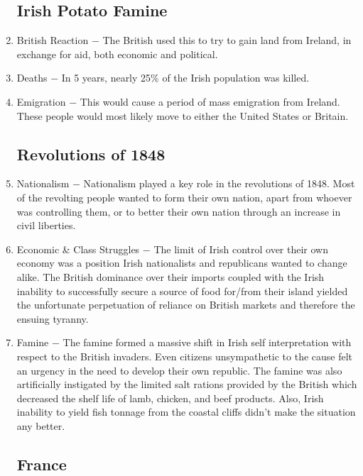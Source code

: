 \documentclass[12pt]{article}
\begin{document}
\begin{enumerate}
\subsection{Irish Potato Famine}

\item British Reaction $-$ The British used this to try to gain land from Ireland, in exchange for aid, both economic and political. 

\item Deaths $-$ In 5 years, nearly 25\% of the Irish population was killed.

\item Emigration $-$ This would cause a period of mass emigration from Ireland. These people would most likely move to either the United States or Britain.

\subsection{Revolutions of 1848}

\item Nationalism $-$ Nationalism played a key role in the revolutions of 1848. Most of the revolting people wanted to form their own nation, apart from whoever was controlling them, or to better their own nation through an increase in civil liberties. 

\item Economic \& Class Struggles $-$ The limit of Irish control over their own economy was a position Irish nationalists and republicans wanted to change alike. The British dominance over their imports coupled with the Irish inability to successfully secure a source of food for/from their island yielded the unfortunate perpetuation of reliance on British markets and therefore the ensuing tyranny.

\item Famine $-$ The famine formed a massive shift in Irish self interpretation with respect to the British invaders. Even citizens unsympathetic to the cause felt an urgency in the need to develop their own republic. The famine was also artificially instigated by the limited salt rations provided by the British which decreased the shelf life of lamb, chicken, and beef products. Also, Irish inability to yield fish tonnage from the coastal cliffs didn't make the situation any better. 

\subsection{France} 


\end{enumerate}
\end{document}
